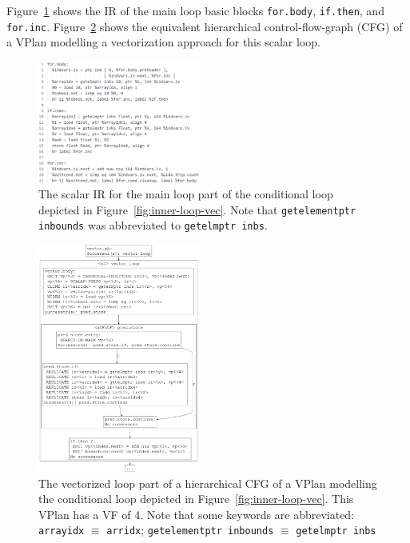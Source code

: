 \documentclass[sigplan,11pt,nonacm]{acmart}
\begin{document}
Figure~\ref{fig:inner-loop-scalar-ir} shows the IR of the main loop basic blocks \texttt{for.body},
\texttt{if.then}, and \texttt{for.inc}. Figure~\ref{fig:inner-loop-vplan-hcfg} shows the equivalent
hierarchical control-flow-graph (CFG) of a VPlan modelling a vectorization approach for this 
scalar loop.


\begin{figure}
  \centering
  \includegraphics[width=0.475\textwidth]{images/inner-loop-scalar-loop-ir.png}
  \caption{The scalar IR for the main loop part of the conditional loop depicted in
  Figure~\ref{fig:inner-loop-vec}. Note that \texttt{getelementptr inbounds}
  was abbreviated to \texttt{getelmptr inbs}.}
  \label{fig:inner-loop-scalar-ir}
\end{figure}

\begin{figure}
  \centering
  \includegraphics[width=0.475\textwidth]{images/inner-loop-vplan-hcfg-loop-body-2.png}
  \caption{The vectorized loop part of a hierarchical CFG of a VPlan modelling the conditional loop
  depicted in Figure~\ref{fig:inner-loop-vec}. This VPlan has a VF of 4. Note that some keywords
  are abbreviated: \texttt{arrayidx} $\equiv$ \texttt{arridx}; 
  \texttt{getelementptr inbounds} $\equiv$ \texttt{getelmptr inbs}}
  \label{fig:inner-loop-vplan-hcfg}
\end{figure}
\end{document}
